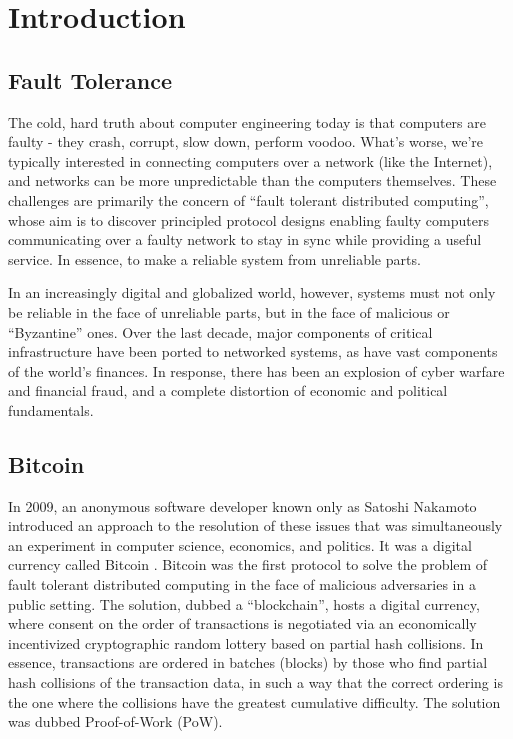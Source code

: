 \chapter{Introduction}
\label{ch:intro}
\section{Fault Tolerance}

The cold, hard truth about computer engineering today is that computers are faulty - 
they crash, corrupt, slow down, perform voodoo. 
What's worse, we're typically interested in connecting computers over a network (like the Internet),
and networks can be more unpredictable than the computers themselves.
These challenges are primarily the concern of ``fault tolerant distributed computing'',
whose aim is to discover principled protocol designs enabling faulty computers communicating over a faulty network 
to stay in sync while providing a useful service.
In essence, to make a reliable system from unreliable parts.

In an increasingly digital and globalized world, however, 
systems must not only be reliable in the face of unreliable parts, but in the face of malicious or ``Byzantine'' ones.
Over the last decade, major components of critical infrastructure have been ported to networked systems,
as have vast components of the world's finances.
In response, there has been an explosion of cyber warfare and financial fraud,
and a complete distortion of economic and political fundamentals.

\section{Bitcoin}

In 2009, an anonymous software developer known only as Satoshi Nakamoto introduced an approach to the resolution of these issues 
that was simultaneously an experiment in computer science, economics, and politics. 
It was a digital currency called Bitcoin \cite{bitcoin}.
Bitcoin was the first protocol to solve the problem of fault tolerant distributed computing in the face of malicious adversaries in a public setting.
The solution, dubbed a ``blockchain'', hosts a digital currency, 
where consent on the order of transactions is negotiated via an economically incentivized cryptographic random lottery based on partial hash collisions.
In essence, transactions are ordered in batches (blocks) by those who find partial hash collisions of the transaction data, 
in such a way that the correct ordering is the one where the collisions have the greatest cumulative difficulty.
The solution was dubbed Proof-of-Work (PoW).

